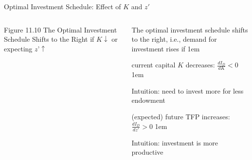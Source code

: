 \documentclass[11pt,aspectratio=43]{beamer}
\let\olditemize=\itemize
\let\endolditemize=\enditemize
\renewenvironment{itemize}{\olditemize \itemsep1em}{\endolditemize}
\theoremstyle{definition}
\begin{document}
\begin{frame}{Optimal Investment Schedule: Effect of $ K $ and $ z' $}
\label{slide:Optimal_Investment_Schedule__Effect_of___K___and___z__}
     \begin{columns}
         \begin{column}{0.5\textwidth}
                \begin{center}
                    \scriptsize Figure 11.10 The Optimal Investment Schedule Shifts to the Right if $K \downarrow $ or expecting $z’ \uparrow $
                \end{center}
         \end{column}
         \begin{column}{0.5\textwidth}
            The optimal investment schedule shifts to the right, i.e., \alert{demand for investment rises} if
            \begin{itemize}
                \item current capital $ K $ decreases:
                    $ \displaystyle \frac{d I_{D}}{d K} < 0 $
                \begin{itemize}
                    \item Intuition: need to invest more for less endowment
                \end{itemize}
                \item (expected) future TFP increases:
                    $ \displaystyle \frac{d I_{D}}{d z'} > 0 $
                \begin{itemize}
                    \item Intuition: investment is more productive
                \end{itemize}
            \end{itemize}
         \end{column}
     \end{columns}
\end{frame}
\end{document}
